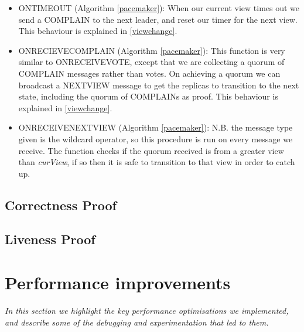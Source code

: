 \begin{itemize}
	\item ON{\large T}IMEOUT (Algorithm \ref{pacemaker}): When our current view times out we send a COMPLAIN to the next leader, and reset our timer for the next view. This behaviour is explained in \ref{viewchange}.
	\item ON{\large R}ECIEVE{\large C}OMPLAIN (Algorithm \ref{pacemaker}): This function is very similar to ON{\large R}ECEIVE{\large V}OTE, except that we are collecting a quorum of COMPLAIN messages rather than votes. On achieving a quorum we can broadcast a NEXT{\large V}IEW message to get the replicas to transition to the next state, including the quorum of COMPLAINs as proof. This behaviour is explained in \ref{viewchange}.
	\item ON{\large R}ECEIVE{\large N}EXT{\large V}IEW (Algorithm \ref{pacemaker}): N.B. the message type given is the wildcard operator, so this procedure is run on every message we receive. The function checks if the quorum received is from a greater view than \textit{curView}, if so then it is safe to transition to that view in order to catch up.
\end{itemize}

\subsection{Correctness Proof}

\subsection{Liveness Proof}
\section{Performance improvements} \label{performance}

\textit{In this section we highlight the key performance optimisations we implemented, and describe some of the debugging and experimentation that led to them.}

